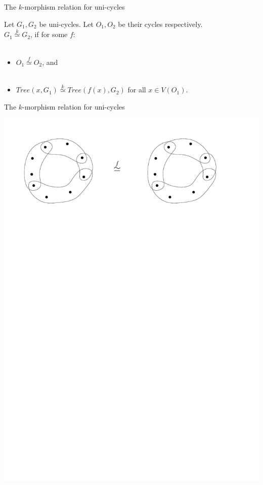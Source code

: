 \documentclass[11pt]{beamer}
\newcommand{\morph}[1]{\stackrel{#1}{\simeq}}
\begin{document}
	\begin{frame}{The $k$-morphism relation for uni-cycles}
	\begin{definition} 
		Let $G_1,G_2$ be uni-cycles. Let $O_1, O_2$ be their cycles respectively.\\
		 $G_1\morph{k}G_2$, if  for some $f$: \\~\\
		\begin{itemize}
			
			\item $O_1 \morph{f} O_2$, and \\~\\
			
			\item $Tree(x,G_1)\morph{k} Tree(f(x),G_2)$ for all $x\in V(O_1)$.
		\end{itemize}
	\end{definition}
	\end{frame}
%	
%	
	\begin{frame}{The $k$-morphism relation for uni-cycles}
	\begin{center}
		\includegraphics[width=0.95\linewidth]{KmorphicCycles1.pdf}
	\end{center}
	\end{frame}
	
\end{document}
